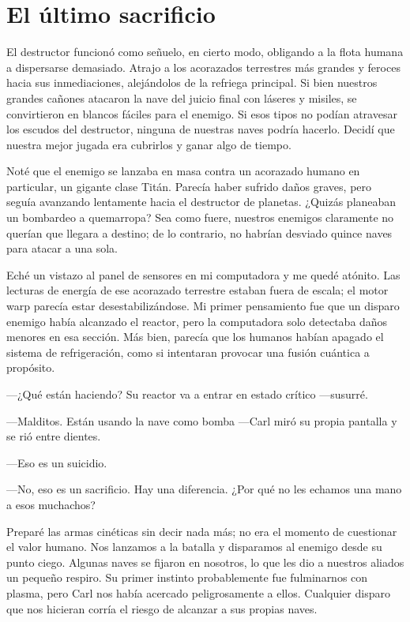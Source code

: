 \chapter{El último sacrificio}\label{sec:el-ultimo-sacrificio}

El destructor funcionó como señuelo, en cierto modo, obligando a la flota humana a dispersarse demasiado. Atrajo a los acorazados terrestres más grandes y feroces hacia sus inmediaciones, alejándolos de la refriega principal. Si bien nuestros grandes cañones atacaron la nave del juicio final con láseres y misiles, se convirtieron en blancos fáciles para el enemigo. Si esos tipos no podían atravesar los escudos del destructor, ninguna de nuestras naves podría hacerlo. Decidí que nuestra mejor jugada era cubrirlos y ganar algo de tiempo.

Noté que el enemigo se lanzaba en masa contra un acorazado humano en particular, un gigante clase Titán. Parecía haber sufrido daños graves, pero seguía avanzando lentamente hacia el destructor de planetas. ¿Quizás planeaban un bombardeo a quemarropa? Sea como fuere, nuestros enemigos claramente no querían que llegara a destino; de lo contrario, no habrían desviado quince naves para atacar a una sola.

Eché un vistazo al panel de sensores en mi computadora y me quedé atónito. Las lecturas de energía de ese acorazado terrestre estaban fuera de escala; el motor warp parecía estar desestabilizándose. Mi primer pensamiento fue que un disparo enemigo había alcanzado el reactor, pero la computadora solo detectaba daños menores en esa sección. Más bien, parecía que los humanos habían apagado el sistema de refrigeración, como si intentaran provocar una fusión cuántica a propósito.

 —¿Qué están haciendo? Su reactor va a entrar en estado crítico —susurré.

—Malditos. Están usando la nave como bomba —Carl miró su propia pantalla y se rió entre dientes.

—Eso es un suicidio.

—No, eso es un sacrificio. Hay una diferencia. ¿Por qué no les echamos una mano a esos muchachos?

Preparé las armas cinéticas sin decir nada más; no era el momento de cuestionar el valor humano. Nos lanzamos a la batalla y disparamos al enemigo desde su punto ciego. Algunas naves se fijaron en nosotros, lo que les dio a nuestros aliados un pequeño respiro. Su primer instinto probablemente fue fulminarnos con plasma, pero Carl nos había acercado peligrosamente a ellos. Cualquier disparo que nos hicieran corría el riesgo de alcanzar a sus propias naves.

